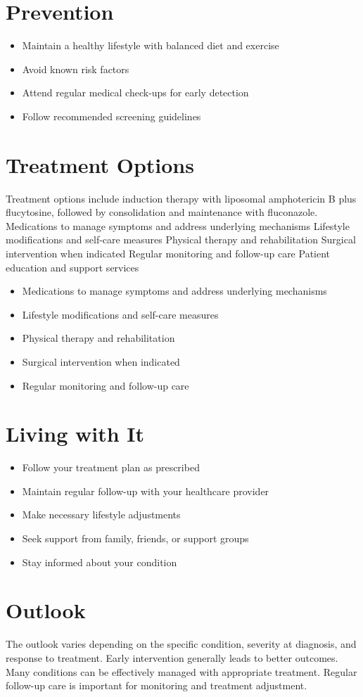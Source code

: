 \section{Prevention}
\begin{itemize}[noitemsep]
  \item Maintain a healthy lifestyle with balanced diet and exercise
  \item Avoid known risk factors
  \item Attend regular medical check-ups for early detection
  \item Follow recommended screening guidelines
\end{itemize}
\section{Treatment Options}
Treatment options include induction therapy with liposomal amphotericin B plus flucytosine, followed by consolidation and maintenance with fluconazole. Medications to manage symptoms and address underlying mechanisms Lifestyle modifications and self-care measures Physical therapy and rehabilitation Surgical intervention when indicated Regular monitoring and follow-up care Patient education and support services

\begin{itemize}[noitemsep]
  \item Medications to manage symptoms and address underlying mechanisms
  \item Lifestyle modifications and self-care measures
  \item Physical therapy and rehabilitation
  \item Surgical intervention when indicated
  \item Regular monitoring and follow-up care
\end{itemize}
\section{Living with It}
\begin{itemize}[noitemsep]
  \item Follow your treatment plan as prescribed
  \item Maintain regular follow-up with your healthcare provider
  \item Make necessary lifestyle adjustments
  \item Seek support from family, friends, or support groups
  \item Stay informed about your condition
\end{itemize}
\section{Outlook}
The outlook varies depending on the specific condition, severity at diagnosis, and response to treatment. Early intervention generally leads to better outcomes. Many conditions can be effectively managed with appropriate treatment. Regular follow-up care is important for monitoring and treatment adjustment.
